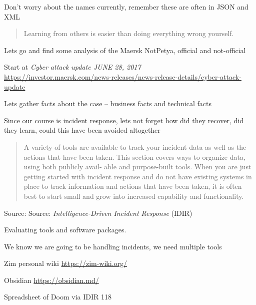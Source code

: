 \documentclass[Screen16to9,17pt]{foils}
\begin{document}
Don't worry about the names currently, remember these are often in JSON and XML



\begin{quote}
Learning from others is easier than doing everything wrong yourself.
\end{quote}

Lets go and find some analysis of the Maersk NotPetya, official and not-official
\begin{list2}
\item Start at \emph{Cyber attack update JUNE 28, 2017}\\
\url{https://investor.maersk.com/news-releases/news-release-details/cyber-attack-update}
\item Lets gather facts about the case -- business facts and technical facts
\item Since our course is incident response, lets not forget how did they recover, did they learn, could this have been avoided altogether
\end{list2}




\begin{quote}
A variety of tools are available to track your incident data as well as the actions that
have been taken. This section covers ways to organize data, using both publicly avail‐
able and purpose-built tools. When you are just getting started with incident
response and do not have existing systems in place to track information and actions
that have been taken, it is often best to start small and grow into increased capability
and functionality.
\end{quote}
Source: Source: \emph{Intelligence-Driven Incident Response} (IDIR)

\begin{list2}
\item Evaluating tools and software packages.
\item We know we are going to be handling incidents, we need multiple tools
\end{list2}





\begin{list2}
\item Zim personal wiki \url{https://zim-wiki.org/}
\item Obsidian \url{https://obsidian.md/}
\item Spreadsheet of Doom via IDIR 118
\end{list2}
\end{document}

